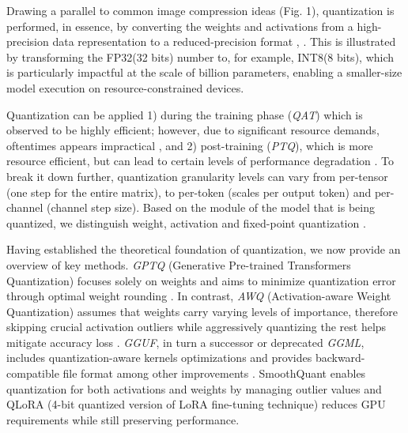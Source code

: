 \documentclass[conference]{IEEEtran}
\begin{document}
Drawing a parallel to common image compression ideas (Fig. 1), quantization is performed, in essence, by converting the weights and activations from a high-precision data representation to a reduced-precision format \cite{zhao2025benchmarking}, \cite{bai2024beyond}. This is illustrated by transforming the FP32(32 bits) number to, for example, INT8(8 bits), which is particularly impactful at the scale of billion parameters, enabling a smaller-size model execution on resource-constrained devices.


Quantization can be applied 1) during the training phase (\textit{QAT}) which is observed to be highly efficient; however, due to significant resource demands, oftentimes appears impractical \cite{chen2024EfficientQAT}, and 2) post-training (\textit{PTQ}), which is more resource efficient, but can lead to certain levels of performance degradation \cite{shen2024exploring}. To break it down further, quantization granularity levels can vary from per-tensor (one step for the entire matrix), to per-token  (scales per output token) and per-channel (channel step size)\cite{shen2024exploring}. Based on the module of the model that is being quantized, we distinguish weight, activation and fixed-point quantization \cite{bai2024beyond}.

Having established the theoretical foundation of quantization, we now provide an overview of key methods. \textit{GPTQ} (Generative Pre-trained Transformers Quantization) focuses solely on weights and aims to minimize quantization error through optimal weight rounding \cite{frantar2023GPTQ}. In contrast, \textit{AWQ} (Activation-aware Weight Quantization) assumes that weights carry varying levels of importance, therefore skipping crucial activation outliers while aggressively quantizing the rest helps mitigate accuracy loss \cite{lin2024AWQ}. \textit{GGUF}, in turn a successor or deprecated \textit{GGML}, includes  quantization-aware kernels optimizations and  provides backward-compatible file format among other improvements \cite{rajput2024benchmarking}. SmoothQuant \cite{xiao2023SmoothQuant} enables quantization for both activations and weights by managing outlier values and QLoRA (4-bit quantized version of LoRA fine-tuning technique) \cite{dettmers2023qlora} reduces GPU requirements while still preserving performance.
\end{document}

